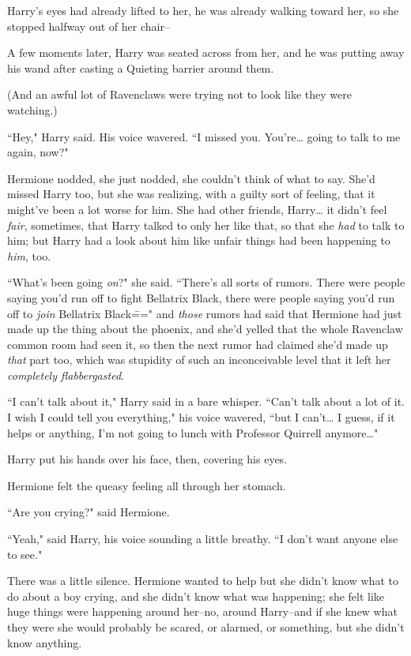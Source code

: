 Harry's eyes had already lifted to her, he was already walking toward her, so she stopped halfway out of her chair\---

A few moments later, Harry was seated across from her, and he was putting away his wand after casting a Quieting barrier around them.

(And an awful lot of Ravenclaws were trying not to look like they were watching.)

``Hey," Harry said. His voice wavered. ``I missed you. You're{\ldots} going to talk to me again, now?"

Hermione nodded, she just nodded, she couldn't think of what to say. She'd missed Harry too, but she was realizing, with a guilty sort of feeling, that it might've been a lot worse for him. She had other friends, Harry{\ldots} it didn't feel \emph{fair}, sometimes, that Harry talked to only her like that, so that she \emph{had} to talk to him; but Harry had a look about him like unfair things had been happening to \emph{him}, too.

``What's been going \emph{on}?" she said. ``There's all sorts of rumors. There were people saying you'd run off to fight Bellatrix Black, there were people saying you'd run off to \emph{join} Bellatrix Black\===" and \emph{those} rumors had said that Hermione had just made up the thing about the phoenix, and she'd yelled that the whole Ravenclaw common room had seen it, so then the next rumor had claimed she'd made up \emph{that} part too, which was stupidity of such an inconceivable level that it left her \emph{completely flabbergasted}.

``I can't talk about it," Harry said in a bare whisper. ``Can't talk about a lot of it. I wish I could tell you everything," his voice wavered, ``but I can't{\ldots} I guess, if it helps or anything, I'm not going to lunch with Professor Quirrell anymore{\ldots}"

Harry put his hands over his face, then, covering his eyes.

Hermione felt the queasy feeling all through her stomach.

``Are you crying?" said Hermione.

``Yeah," said Harry, his voice sounding a little breathy. ``I don't want anyone else to see."

There was a little silence. Hermione wanted to help but she didn't know what to do about a boy crying, and she didn't know what was happening; she felt like huge things were happening around her\---no, around Harry\---and if she knew what they were she would probably be scared, or alarmed, or something, but she didn't know anything.

